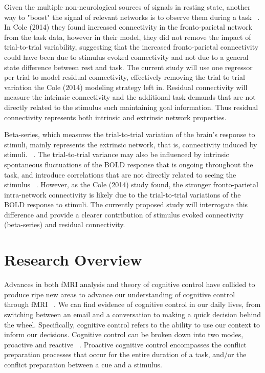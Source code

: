 \documentclass[phd,appendix,figures]{uithesis}
\begin{document}
Given the multiple non-neurological sources of signals in resting state, another way to "boost" the signal of relevant networks is to observe them during a task ~\citep{Cole2014}.
In Cole (2014) they found increased connectivity in the fronto-parietal network from the task data, however in their model, they did not remove the impact of trial-to-trial variability, suggesting that the increased fronto-parietal connectivity could have been due to stimulus evoked connectivity and not due to a general state difference between rest and task.
The current study will use one regressor per trial to model residual connectivity, effectively removing the trial to trial variation the Cole (2014) modeling strategy left in.
Residual connectivity will measure the intrinsic connectivity and the additional task demands that are not directly related to the stimulus such maintaining goal information.
Thus residual connectivity represents both intrinsic and extrinsic network properties.

Beta-series, which measures the trial-to-trial variation of the brain's response to stimuli, mainly represents the extrinsic network, that is, connectivity induced by stimuli. ~\citep{Rissman2004}.
The trial-to-trial variance may also be influenced by intrinsic spontaneous fluctuations of the BOLD response that is ongoing throughout the task, and introduce correlations that are not directly related to seeing the stimulus ~\citep{He2013}.
However, as the Cole (2014) study found, the stronger fronto-parietal intra-network connectivity is likely due to the trial-to-trial variations of the BOLD response to stimuli.
The currently proposed study will interrogate this difference and provide a clearer contribution of stimulus evoked connectivity (beta-series) and residual connectivity.


\chapter{Research Overview}

Advances in both fMRI analysis and theory of cognitive control have collided to produce ripe new areas to advance our understanding of cognitive control through fMRI ~\citep{Braver2012,Rissman2004,Mumford2012,Cisler2012}.
We can find evidence of cognitive control in our daily lives, from switching between an email and a conversation to making a quick decision behind the wheel. 
Specifically, cognitive control refers to the ability to use our context to inform our decisions. Cognitive control can be broken down into two modes, proactive and reactive ~\citep{Braver2012}. 
Proactive cognitive control encompasses the conflict preparation processes that occur for the entire duration of a task, and/or the conflict preparation between a cue and a stimulus.
\end{document}
